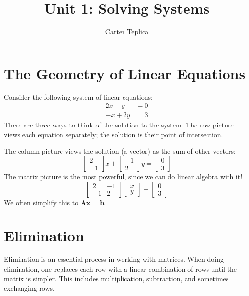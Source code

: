 \documentclass[10pt,letterpaper,twocolumn]{article}
\author{Carter Teplica}
\title{Unit 1: Solving Systems}
\newcommand{\matr}[1]{\mathbf{#1}}
\begin{document}
\maketitle
\section{The Geometry of Linear Equations}

Consider the following system of linear equations:
\begin{align*}
	2x - y &= 0\\
	-x + 2y &= 3
\end{align*}
There are three ways to think of the solution to the system.
The row picture views each equation separately; the solution is their point of intersection.
\begin{center}
\end{center}
The column picture views the solution (a vector) as the sum of other vectors:
$$
\begin{bmatrix}
2 \\ 
-1
\end{bmatrix}
 x +\begin{bmatrix}
-1 \\ 
2
\end{bmatrix}
 y =
  \begin{bmatrix}
0 \\ 
3
\end{bmatrix}
 $$
The matrix picture is the most powerful, since we can do linear algebra with it!
$$
\begin{bmatrix}
2 & -1 \\ 
-1 & 2
\end{bmatrix} 
\begin{bmatrix}
x \\ 
y
\end{bmatrix} =
\begin{bmatrix}
0 \\ 
3
\end{bmatrix} 
$$
We often simplify this to $\matr{A}\matr{x} = \matr{b}$.

\section{Elimination}
Elimination is an essential process in working with matrices. When doing elimination, one replaces each row with a linear combination of rows until the matrix is simpler. This includes multiplication, subtraction, and sometimes exchanging rows.
\end{document}
